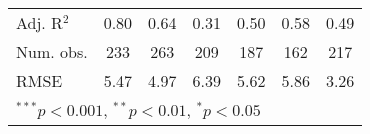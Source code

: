 \documentclass[12pt]{article}
\begin{document}
\begin{table}
\begin{center}
\begin{tabular}{l c c c c c c }
			Adj. R$^2$             & 0.80          & 0.64          & 0.31         & 0.50         & 0.58          & 0.49          \\
			Num. obs.              & 233           & 263           & 209          & 187          & 162           & 217           \\
			RMSE                   & 5.47          & 4.97          & 6.39         & 5.62         & 5.86          & 3.26          \\
			\hline
			\multicolumn{7}{l}{\scriptsize{$^{***}p<0.001$, $^{**}p<0.01$, $^*p<0.05$}}
		\end{tabular}
	\end{center}
\end{table}
\end{document}
